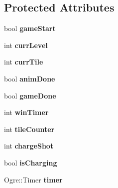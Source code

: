 \subsection*{Protected Attributes}
\begin{DoxyCompactItemize}
\item 
\hypertarget{classMinimalOgre_a2a3bf06b8a55652ad459d56d034d2601}{bool {\bfseries game\-Start}}\label{classMinimalOgre_a2a3bf06b8a55652ad459d56d034d2601}

\item 
\hypertarget{classMinimalOgre_a6dabc7fb78bc082b10e2d157b4378e86}{int {\bfseries curr\-Level}}\label{classMinimalOgre_a6dabc7fb78bc082b10e2d157b4378e86}

\item 
\hypertarget{classMinimalOgre_a3c83704180c8a8c3e9d7c253737450bc}{int {\bfseries curr\-Tile}}\label{classMinimalOgre_a3c83704180c8a8c3e9d7c253737450bc}

\item 
\hypertarget{classMinimalOgre_a6352497df96b97c2bd96446ab9f8af6a}{bool {\bfseries anim\-Done}}\label{classMinimalOgre_a6352497df96b97c2bd96446ab9f8af6a}

\item 
\hypertarget{classMinimalOgre_a9c0749622a038154c2e91e2b24b28bcd}{bool {\bfseries game\-Done}}\label{classMinimalOgre_a9c0749622a038154c2e91e2b24b28bcd}

\item 
\hypertarget{classMinimalOgre_a2dad690715e60f6414147a63a2839dfc}{int {\bfseries win\-Timer}}\label{classMinimalOgre_a2dad690715e60f6414147a63a2839dfc}

\item 
\hypertarget{classMinimalOgre_a7329e5ff36d32be21ab8a21cc264138f}{int {\bfseries tile\-Counter}}\label{classMinimalOgre_a7329e5ff36d32be21ab8a21cc264138f}

\item 
\hypertarget{classMinimalOgre_a056e3d34bc98fd164cc4863fd38e2fb6}{int {\bfseries charge\-Shot}}\label{classMinimalOgre_a056e3d34bc98fd164cc4863fd38e2fb6}

\item 
\hypertarget{classMinimalOgre_adeefd78d82d91ef842bc2ded99ed9b3e}{bool {\bfseries is\-Charging}}\label{classMinimalOgre_adeefd78d82d91ef842bc2ded99ed9b3e}

\item 
\hypertarget{classMinimalOgre_aeca6e86981e045dc32fd29a337538843}{Ogre\-::\-Timer {\bfseries timer}}\label{classMinimalOgre_aeca6e86981e045dc32fd29a337538843}


\end{DoxyCompactItemize}
